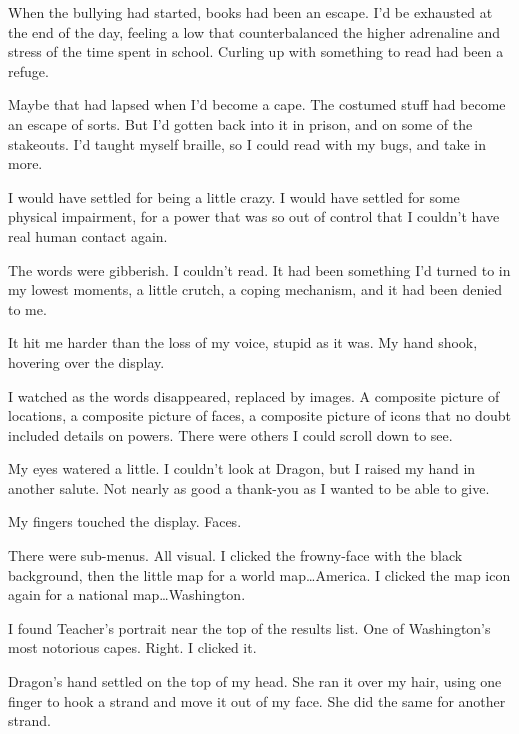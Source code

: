 When the bullying had started, books had been an escape.  I'd be exhausted at the end of the day, feeling a low that counterbalanced the higher adrenaline and stress of the time spent in school.  Curling up with something to read had been a refuge.



Maybe that had lapsed when I'd become a cape.  The costumed stuff had become an escape of sorts.  But I'd gotten back into it in prison, and on some of the stakeouts.  I'd taught myself braille, so I could read with my bugs, and take in more.



I would have settled for being a little crazy.  I would have settled for some physical impairment, for a power that was so out of control that I couldn't have real human contact again.



The words were gibberish.  I couldn't read.  It had been something I'd turned to in my lowest moments, a little crutch, a coping mechanism, and it had been denied to me.



It hit me harder than the loss of my voice, stupid as it was.  My hand shook, hovering over the display.



I watched as the words disappeared, replaced by images.  A composite picture of locations, a composite picture of faces, a composite picture of icons that no doubt included details on powers.  There were others I could scroll down to see.



My eyes watered a little.  I couldn't look at Dragon, but I raised my hand in another salute.  Not nearly as good a thank-you as I wanted to be able to give.



My fingers touched the display.  Faces.



There were sub-menus.  All visual.  I clicked the frowny-face with the black background, then the little map for a world map\ldots America.  I clicked the map icon again for a national map\ldots Washington.



I found Teacher's portrait near the top of the results list.  One of Washington's most notorious capes.  Right.  I clicked it.



Dragon's hand settled on the top of my head.  She ran it over my hair, using one finger to hook a strand and move it out of my face.  She did the same for another strand.



